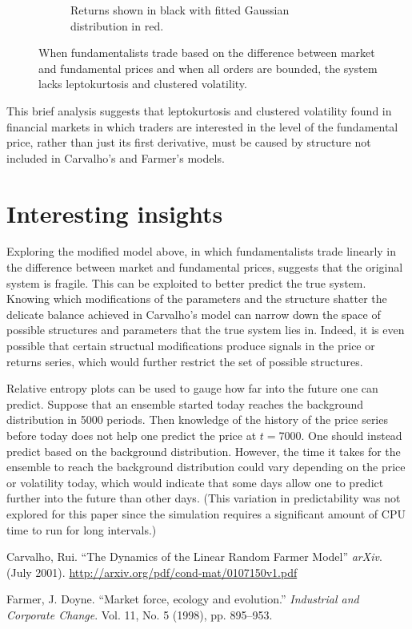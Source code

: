 \documentclass{article}
\begin{document}
\begin{figure}[h]
\begin{subfigure}[b]{0.48\textwidth}
    \caption{Returns shown in black with fitted Gaussian distribution in red.}
  \end{subfigure}
  \caption{When fundamentalists trade based on the difference between market and fundamental prices and when all orders are bounded, the system lacks leptokurtosis and clustered volatility.}
  \label{fig:broken}
\end{figure}
This brief analysis suggests that leptokurtosis and clustered volatility found in financial markets in which traders are interested in the level of the fundamental price, rather than just its first derivative, must be caused by structure not included in Carvalho's and Farmer's models.

\section{Interesting insights}

Exploring the modified model above, in which fundamentalists trade linearly in the difference between market and fundamental prices, suggests that the original system is fragile. This can be exploited to better predict the true system. Knowing which modifications of the parameters and the structure shatter the delicate balance achieved in Carvalho's model can narrow down the space of possible structures and parameters that the true system lies in. Indeed, it is even possible that certain structual modifications produce signals in the price or returns series, which would further restrict the set of possible structures.

Relative entropy plots can be used to gauge how far into the future one can predict. Suppose that an ensemble started today reaches the background distribution in 5000 periods. Then knowledge of the history of the price series before today does not help one predict the price at $t=7000$. One should instead predict based on the background distribution. However, the time it takes for the ensemble to reach the background distribution could vary depending on the price or volatility today, which would indicate that some days allow one to predict further into the future than other days. (This variation in predictability was not explored for this paper since the simulation requires a significant amount of CPU time to run for long intervals.)


\begin{thebibliography}{9}

Carvalho, Rui.
``The Dynamics of the Linear Random Farmer Model''
\textit{arXiv}.
(July 2001).
\url{http://arxiv.org/pdf/cond-mat/0107150v1.pdf}

Farmer, J. Doyne.
``Market force, ecology and evolution.''
\textit{Industrial and Corporate Change}.
Vol. 11, No. 5 (1998),
pp. 895--953.

\end{thebibliography}


\end{document}
